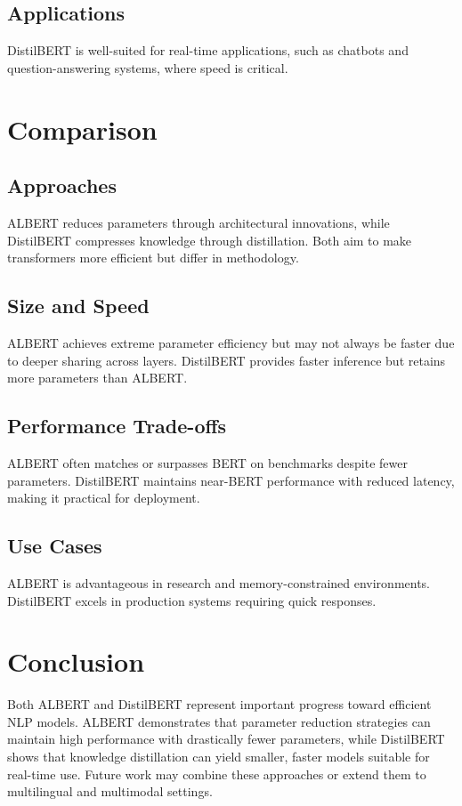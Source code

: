\documentclass{article}
\begin{document}
\subsection{Applications}
DistilBERT is well-suited for real-time applications, such as chatbots and question-answering systems, where speed is critical.

\section{Comparison}
\subsection{Approaches}
ALBERT reduces parameters through architectural innovations, while DistilBERT compresses knowledge through distillation. Both aim to make transformers more efficient but differ in methodology.

\subsection{Size and Speed}
ALBERT achieves extreme parameter efficiency but may not always be faster due to deeper sharing across layers. DistilBERT provides faster inference but retains more parameters than ALBERT.

\subsection{Performance Trade-offs}
ALBERT often matches or surpasses BERT on benchmarks despite fewer parameters. DistilBERT maintains near-BERT performance with reduced latency, making it practical for deployment.

\subsection{Use Cases}
ALBERT is advantageous in research and memory-constrained environments. DistilBERT excels in production systems requiring quick responses.

\section{Conclusion}
Both ALBERT and DistilBERT represent important progress toward efficient NLP models. ALBERT demonstrates that parameter reduction strategies can maintain high performance with drastically fewer parameters, while DistilBERT shows that knowledge distillation can yield smaller, faster models suitable for real-time use. Future work may combine these approaches or extend them to multilingual and multimodal settings.
\end{document}
